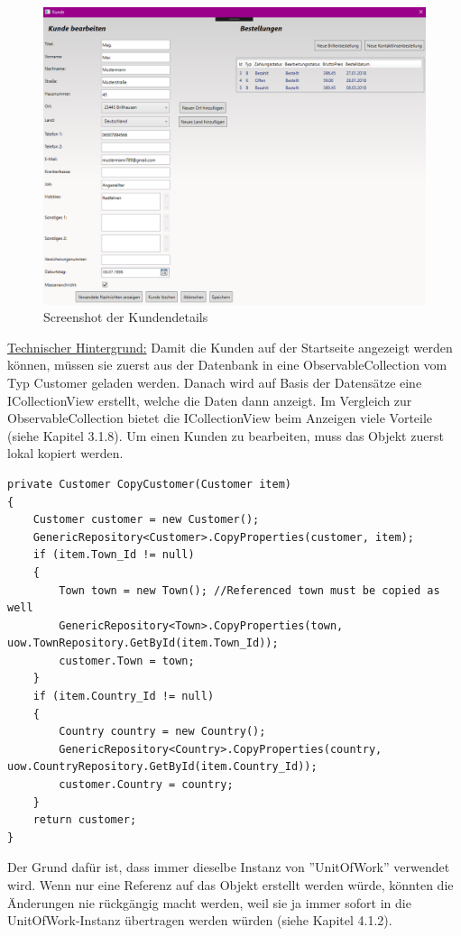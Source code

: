 \begin{figure}[H]
\begin{center}
	\includegraphics[scale=.4]{images/KundenDetails.png}
\end{center}
	\caption{Screenshot der Kundendetails}
	\label{fig:sample}
\end{figure}
\noindent \underline{Technischer Hintergrund:}
Damit die Kunden auf der Startseite angezeigt werden können, müssen sie zuerst aus der Datenbank in eine ObservableCollection vom Typ Customer geladen werden. 
Danach wird auf Basis der Datensätze eine ICollectionView erstellt, welche die Daten dann anzeigt. Im Vergleich zur ObservableCollection bietet die ICollectionView beim Anzeigen viele Vorteile (siehe Kapitel 3.1.8). 
Um einen Kunden zu bearbeiten, muss das Objekt zuerst lokal kopiert werden.
\begin{lstlisting}
private Customer CopyCustomer(Customer item)
{
	Customer customer = new Customer();
	GenericRepository<Customer>.CopyProperties(customer, item);
	if (item.Town_Id != null)
	{
		Town town = new Town(); //Referenced town must be copied as well
		GenericRepository<Town>.CopyProperties(town, 	uow.TownRepository.GetById(item.Town_Id));
		customer.Town = town;
	}
	if (item.Country_Id != null)
	{
		Country country = new Country();
		GenericRepository<Country>.CopyProperties(country, uow.CountryRepository.GetById(item.Country_Id));
		customer.Country = country;
	}
	return customer;
}
\end{lstlisting}
Der Grund dafür ist, dass immer dieselbe Instanz von ''UnitOfWork'' verwendet wird. Wenn nur eine Referenz auf das Objekt erstellt werden würde, könnten die Änderungen nie rückgängig macht werden, weil sie ja immer sofort in die UnitOfWork-Instanz \newline übertragen werden würden (siehe Kapitel 4.1.2).
